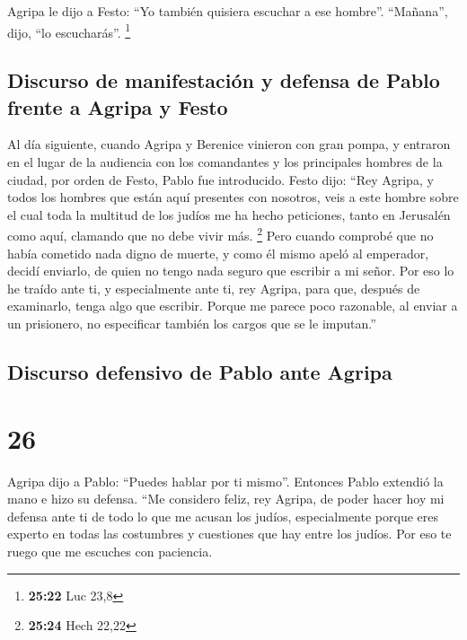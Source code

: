  Agripa le dijo a Festo: ``Yo también quisiera escuchar a
ese hombre''. ``Mañana'', dijo, ``lo escucharás''. \footnote{\textbf{25:22}
  Luc 23,8}

\hypertarget{discurso-de-manifestaciuxf3n-y-defensa-de-pablo-frente-a-agripa-y-festo}{%
\subsection{Discurso de manifestación y defensa de Pablo frente a Agripa
y
Festo}\label{discurso-de-manifestaciuxf3n-y-defensa-de-pablo-frente-a-agripa-y-festo}}

 Al día siguiente, cuando Agripa y Berenice vinieron con
gran pompa, y entraron en el lugar de la audiencia con los comandantes y
los principales hombres de la ciudad, por orden de Festo, Pablo fue
introducido.  Festo dijo: ``Rey Agripa, y todos los
hombres que están aquí presentes con nosotros, veis a este hombre sobre
el cual toda la multitud de los judíos me ha hecho peticiones, tanto en
Jerusalén como aquí, clamando que no debe vivir más. \footnote{\textbf{25:24}
  Hech 22,22}  Pero cuando comprobé que no había cometido
nada digno de muerte, y como él mismo apeló al emperador, decidí
enviarlo,  de quien no tengo nada seguro que escribir a
mi señor. Por eso lo he traído ante ti, y especialmente ante ti, rey
Agripa, para que, después de examinarlo, tenga algo que escribir.
 Porque me parece poco razonable, al enviar a un
prisionero, no especificar también los cargos que se le imputan.''

\hypertarget{discurso-defensivo-de-pablo-ante-agripa}{%
\subsection{Discurso defensivo de Pablo ante
Agripa}\label{discurso-defensivo-de-pablo-ante-agripa}}

\hypertarget{section-25}{%
\section{26}\label{section-25}}

 Agripa dijo a Pablo: ``Puedes hablar por ti mismo''.
Entonces Pablo extendió la mano e hizo su defensa.  ``Me
considero feliz, rey Agripa, de poder hacer hoy mi defensa ante ti de
todo lo que me acusan los judíos,  especialmente porque
eres experto en todas las costumbres y cuestiones que hay entre los
judíos. Por eso te ruego que me escuches con paciencia.


